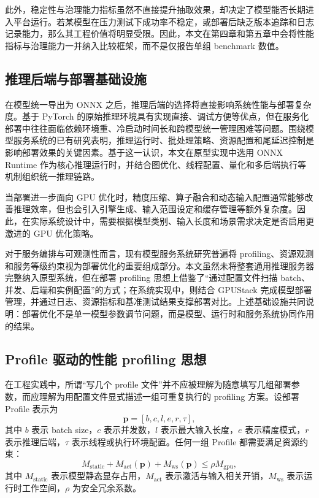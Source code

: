 此外，稳定性与治理能力指标虽然不直接提升抽取效果，却决定了模型能否长期进入平台运行。若某模型在压力测试下成功率不稳定，或部署后缺乏版本追踪和日志记录能力，那么其工程价值将明显受限。因此，本文在第四章和第五章中会将性能指标与治理能力一并纳入比较框架，而不是仅报告单组 benchmark 数值。

\subsection{推理后端与部署基础设施}
在模型统一导出为 ONNX 之后，推理后端的选择将直接影响系统性能与部署复杂度。基于 PyTorch 的原始推理环境具有实现直接、调试方便等优点，但在服务化部署中往往面临依赖环境重、冷启动时间长和跨模型统一管理困难等问题。围绕模型服务系统的已有研究表明，推理运行时、批处理策略、资源配置和尾延迟控制是影响部署效果的关键因素\cite{clockwork2020,clipper2017}。基于这一认识，本文在原型实现中选用 ONNX Runtime 作为核心推理运行时，并结合图优化、线程配置、量化和多后端执行等机制组织统一推理链路。

当部署进一步面向 GPU 优化时，精度压缩、算子融合和动态输入配置通常能够改善推理效率，但也会引入引擎生成、输入范围设定和缓存管理等额外复杂度。因此，在实际系统设计中，需要根据模型类别、输入长度和场景需求决定是否启用更激进的 GPU 优化策略。

对于服务编排与可观测性而言，现有模型服务系统研究普遍将 profiling、资源观测和服务等级约束视为部署优化的重要组成部分\cite{clipper2017,clockwork2020}。本文虽然未将整套通用推理服务器完整纳入原型系统，但在部署 profiling 思想上借鉴了“通过配置文件扫描 batch、并发、后端和实例配置”的方式；在系统实现中，则结合 GPUStack 完成模型部署管理，并通过日志、资源指标和基准测试结果支撑部署对比。上述基础设施共同说明：部署优化不是单一模型参数调节问题，而是模型、运行时和服务系统协同作用的结果。

\subsection{Profile 驱动的性能 profiling 思想}
在工程实践中，所谓“写几个 profile 文件”并不应被理解为随意填写几组部署参数，而应理解为用配置文件显式描述一组可重复执行的 profiling 方案。设部署 Profile 表示为
\begin{equation}
\mathbf{p}=[b,c,l,e,r,\tau],
\label{eq:foundation_profile}
\end{equation}
其中 $b$ 表示 batch size，$c$ 表示并发数，$l$ 表示最大输入长度，$e$ 表示精度模式，$r$ 表示推理后端，$\tau$ 表示线程或执行环境配置。任何一组 Profile 都需要满足资源约束：
\begin{equation}
M_{\text{static}}+M_{\text{act}}(\mathbf{p})+M_{\text{ws}}(\mathbf{p})\leq \rho M_{\text{gpu}},
\label{eq:foundation_memory}
\end{equation}
其中 $M_{\text{static}}$ 表示模型静态显存占用，$M_{\text{act}}$ 表示激活与输入相关开销，$M_{\text{ws}}$ 表示运行时工作空间，$\rho$ 为安全冗余系数。

